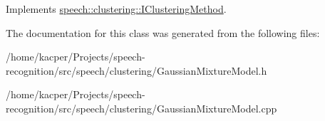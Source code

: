 Implements \hyperlink{classspeech_1_1clustering_1_1IClusteringMethod_a9676e73a7c47d5383e9359850086249c}{speech\+::clustering\+::\+I\+Clustering\+Method}.



The documentation for this class was generated from the following files\+:\begin{DoxyCompactItemize}
\item 
/home/kacper/\+Projects/speech-\/recognition/src/speech/clustering/Gaussian\+Mixture\+Model.\+h\item 
/home/kacper/\+Projects/speech-\/recognition/src/speech/clustering/Gaussian\+Mixture\+Model.\+cpp\end{DoxyCompactItemize}
